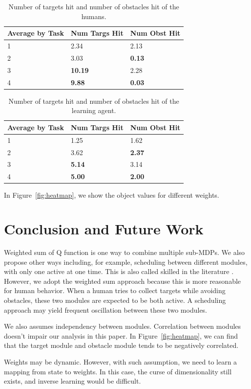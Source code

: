 \documentclass[11pt]{article} %
\begin{document}
\begin{table}[h]
\centering
\begin{tabular}{| l| l| l |}
\hline
Average by Task & Num Targs Hit & Num Obst Hit\\
\hline
1 & 2.34 &  2.13\\
\hline
2 & 3.03 &  \bf{0.13}\\
\hline
3 & \bf{10.19} & 2.28\\
\hline
4 & \bf{9.88} &  \bf{0.03}\\
\hline
\end{tabular}
\caption{Number of targets hit and number of obstacles hit of the humans.}
\end{table}

\begin{table}[h]
\centering
\begin{tabular}{| l| l| l |}
\hline
Average by Task & Num Targs Hit & Num Obst Hit\\
\hline
1 & 1.25 & 1.62\\
\hline
2 & 3.62 & \bf{2.37}\\
\hline
3 & \bf{5.14} & 3.14\\
\hline
4 & \bf{5.00} & \bf{2.00}\\
\hline
\end{tabular}
\caption{Number of targets hit and number of obstacles hit of the learning agent.}
\end{table}

In Figure~\ref{fig:heatmap}, we show the object values for different weights.


\section{Conclusion and Future Work}
\label{sec:conclude}

Weighted sum of Q function is one way to combine multiple sub-MDPs. We also
propose other ways including, for example, scheduling between different modules,
with only one active at one time. This is also called skilled in the literature
\cite{konidaris2009skill}. However, we adopt the weighted sum approach
because this is more reasonable for human behavior. When a human tries to collect
targets while avoiding obstacles, these two modules are expected to be both
active. A scheduling approach may yield frequent oscillation between these two
modules.

We also assumes independency between modules. Correlation between modules
doesn't impair our analysis in this paper. In Figure~\ref{fig:heatmap}, we can
find that the target module and obstacle module tends to be negatively
correlated.

Weights may be dynamic. However, with such assumption, we need to learn a
mapping from state to weights. In this case, the curse of dimensionality still
exists, and inverse learning would be difficult.



\end{document}
